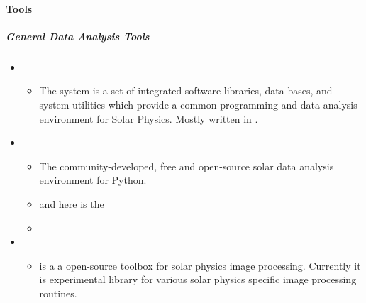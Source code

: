 \documentclass[letterpaper,10pt,english]{sphinxmanual}
\begin{document}
\paragraph{Tools}
\label{\detokenize{resource/astro/topics/solar_physics:tools}}

\subparagraph{General Data Analysis Tools}
\label{\detokenize{resource/astro/topics/solar_physics:general-data-analysis-tools}}\begin{itemize}
\item {} 
\begin{itemize}
\item {} 
The  system is a set of integrated software
libraries, data bases, and system utilities which provide a common
programming and data analysis environment for Solar Physics.
Mostly written in .

\end{itemize}

\item {} 
\begin{itemize}
\item {} 
The community-developed, free and open-source solar data analysis
environment for Python. 

\item {} 
 and here
is the 

\item {} 

\end{itemize}

\item {} 
\begin{itemize}
\item {} 
 is a a open-source toolbox for solar physics
image processing. Currently it is experimental library for various
solar physics specific image processing routines.

\end{itemize}

\end{itemize}
\end{document}
